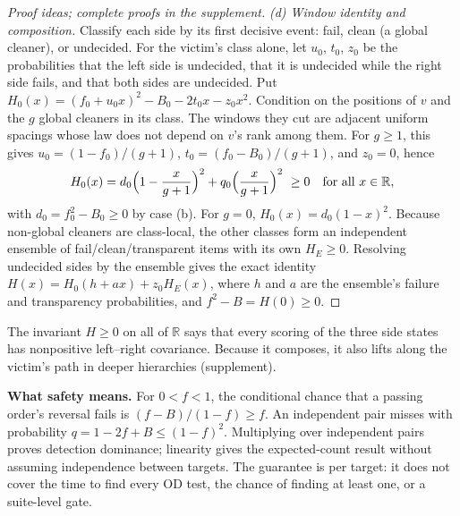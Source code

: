 \documentclass[conference,letterpaper]{IEEEtran}
\theoremstyle{definition}
\begin{document}
\begin{proof}[Proof ideas; complete proofs in the supplement]
\emph{(d) Window identity and composition.} Classify each side by its first decisive event: fail, clean (a global cleaner), or undecided. For the victim's class alone, let $u_0$, $t_0$, $z_0$ be the probabilities that the left side is undecided, that it is undecided while the right side fails, and that both sides are undecided. Put $H_0(x)=(f_0+u_0x)^2-B_0-2t_0x-z_0x^2$. Condition on the positions of $v$ and the $g$ global cleaners in its class. The windows they cut are adjacent uniform spacings whose law does not depend on $v$'s rank among them. For $g\ge1$, this gives $u_0=(1-f_0)/(g+1)$, $t_0=(f_0-B_0)/(g+1)$, and $z_0=0$, hence
\[
H_0(x)=d_0\Bigl(1-\frac{x}{g+1}\Bigr)^{2}+q_0\Bigl(\frac{x}{g+1}\Bigr)^{2}\ \ge0\quad\text{for all }x\in\mathbb R,
\]
with $d_0=f_0^2-B_0\ge0$ by case (b). For $g=0$, $H_0(x)=d_0(1-x)^2$. Because non-global cleaners are class-local, the other classes form an independent ensemble of fail/clean/transparent items with its own $H_E\ge0$. Resolving undecided sides by the ensemble gives the exact identity $H(x)=H_0(h+ax)+z_0H_E(x)$, where $h$ and $a$ are the ensemble's failure and transparency probabilities, and $f^2-B=H(0)\ge0$.
\end{proof}
The invariant $H\ge0$ on all of $\mathbb R$ says that every scoring of the three side states has nonpositive left--right covariance. Because it composes, it also lifts along the victim's path in deeper hierarchies (supplement).

\textbf{What safety means.}\label{cor:tacas}
For $0<f<1$, the conditional chance that a passing order's reversal fails is $(f-B)/(1-f)\ge f$. An independent pair misses with probability $q=1-2f+B\le(1-f)^2$. Multiplying over independent pairs proves detection dominance; linearity gives the expected-count result without assuming independence between targets. The guarantee is per target: it does not cover the time to find every OD test, the chance of finding at least one, or a suite-level gate.
\end{document}
